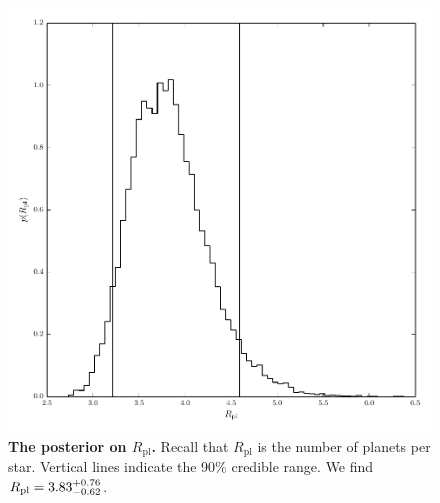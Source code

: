 \documentclass{nature}
\newcommand{\Rpl}{R_\mathrm{pl}}
\begin{document}
\begin{figure}
  \includegraphics[width=\columnwidth]{npl}
  \caption{\label{fig:npl} \textbf{The posterior on $\Rpl$.}  Recall
    that $\Rpl$ is the number of planets per star.  Vertical lines
    indicate the 90\% credible range.  We find $\Rpl =
    \rplrange$.}
\end{figure}
\end{document}
